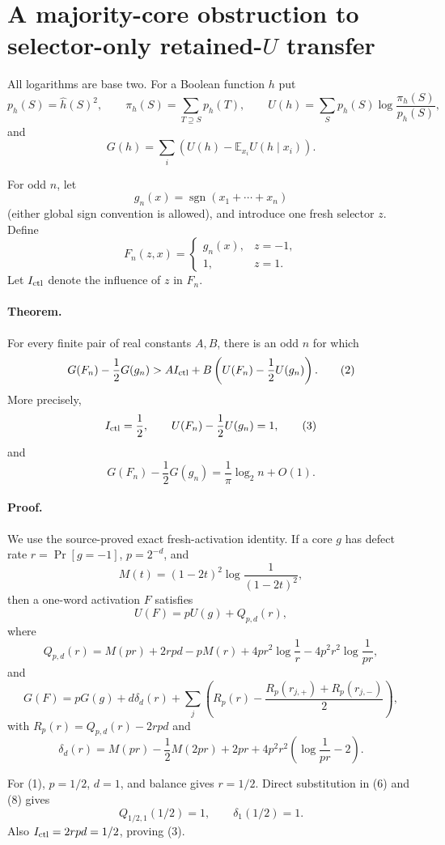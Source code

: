 \section*{A majority-core obstruction to selector-only retained-$U$ transfer}

All logarithms are base two.  For a Boolean function $h$ put
\[
 p_h(S)=\widehat h(S)^2,\qquad
 \pi_h(S)=\sum_{T\supseteq S}p_h(T),\qquad
 U(h)=\sum_Sp_h(S)\log\frac{\pi_h(S)}{p_h(S)},
\]
and
\[
 G(h)=\sum_i\left(U(h)-\mathbb E_{x_i}U(h\mid x_i)\right).
\]

For odd $n$, let
\[
 g_n(x)=\operatorname{sgn}(x_1+\cdots+x_n)
\]
(either global sign convention is allowed), and introduce one fresh selector
$z$.  Define
\[
 F_n(z,x)=\begin{cases}g_n(x),&z=-1,\\1,&z=1.\end{cases}
 \tag{1}
\]
Let $I_{\rm ctl}$ denote the influence of $z$ in $F_n$.

\paragraph{Theorem.}
For every finite pair of real constants $A,B$, there is an odd $n$ for
which
\[
 G(F_n)-\frac12G(g_n)
 > A I_{\rm ctl}
 +B\left(U(F_n)-\frac12U(g_n)\right).                 \tag{2}
\]
More precisely,
\[
 I_{\rm ctl}=\frac12,\qquad
 U(F_n)-\frac12U(g_n)=1,                              \tag{3}
\]
and
\[
 G(F_n)-\frac12G(g_n)=\frac1\pi\log_2 n+O(1).        \tag{4}
\]

\paragraph{Proof.}
We use the source-proved exact fresh-activation identity.  If a core $g$ has
defect rate $r=\Pr[g=-1]$, $p=2^{-d}$, and
\[
 M(t)=(1-2t)^2\log\frac1{(1-2t)^2},
\]
then a one-word activation $F$ satisfies
\[
 U(F)=pU(g)+Q_{p,d}(r),                                \tag{5}
\]
where
\[
 Q_{p,d}(r)=M(pr)+2rpd-pM(r)
 +4pr^2\log\frac1r-4p^2r^2\log\frac1{pr},            \tag{6}
\]
and
\[
 G(F)=pG(g)+d\delta_d(r)
 +\sum_j\left(R_p(r)-\frac{R_p(r_{j,+})+R_p(r_{j,-})}{2}\right), \tag{7}
\]
with $R_p(r)=Q_{p,d}(r)-2rpd$ and
\[
 \delta_d(r)=M(pr)-\frac12M(2pr)+2pr
 +4p^2r^2\left(\log\frac1{pr}-2\right).              \tag{8}
\]

For (1), $p=1/2$, $d=1$, and balance gives $r=1/2$.  Direct substitution in
(6) and (8) gives
\[
 Q_{1/2,1}(1/2)=1,\qquad \delta_1(1/2)=1.             \tag{9}
\]
Also $I_{\rm ctl}=2rpd=1/2$, proving (3).

